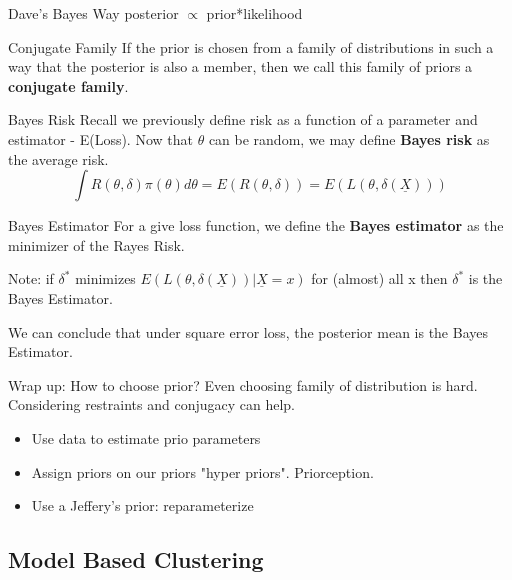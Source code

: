\documentclass[11pt,fleqn]{book} %
\begin{document}
\begin{proposition}{Dave's Bayes Way}
 posterior $\propto$ prior*likelihood
\end{proposition}

\begin{definition}{Conjugate Family}
If the prior is chosen from a family of distributions in such a way that the posterior is also a member, then we call this family of priors a \textbf{conjugate family}.
\end{definition}

\begin{definition}{Bayes Risk}
	Recall we previously define risk as a function of a parameter and estimator - E(Loss). Now that $\theta$ can be random, we may define \textbf{Bayes risk} as the average risk.
	$$\int R(\theta,\delta)\pi(\theta) d\theta = E(R(\theta,\delta)) = E(L(\theta,\delta(\underline{X}))) $$
\end{definition}

\begin{definition}{Bayes Estimator}
	For a give loss function, we define the \textbf{Bayes estimator} as the minimizer of the Rayes Risk. 
\end{definition}
Note: if $\delta^*$ minimizes $E(L(\theta,\delta(\underline{X}))|\underline{X}=x)$ for (almost) all x then $\delta^*$ is the Bayes Estimator. 

We can conclude that under square error loss, the posterior mean is the Bayes Estimator. 

Wrap up: How to choose prior? Even choosing family of distribution is hard. Considering restraints and conjugacy can help.
\begin{itemize}
	\item Use data to estimate prio parameters
	\item Assign priors on our priors "hyper priors". Priorception.
	\item Use a Jeffery's prior: reparameterize
\end{itemize}

\subsection{Model Based Clustering}

\end{document}
